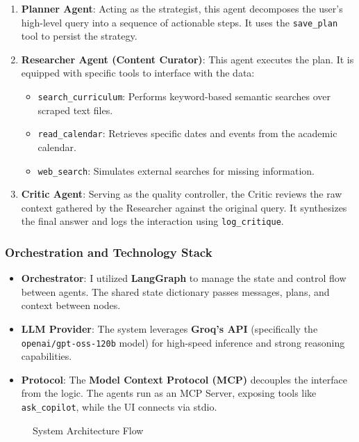 \begin{enumerate}
    \item \textbf{Planner Agent}: Acting as the strategist, this agent decomposes the user's high-level query into a sequence of actionable steps. It uses the \texttt{save\_plan} tool to persist the strategy.
    \item \textbf{Researcher Agent (Content Curator)}: This agent executes the plan. It is equipped with specific tools to interface with the data:
    \begin{itemize}
        \item \texttt{search\_curriculum}: Performs keyword-based semantic searches over scraped text files.
        \item \texttt{read\_calendar}: Retrieves specific dates and events from the academic calendar.
        \item \texttt{web\_search}: Simulates external searches for missing information.
    \end{itemize}
    \item \textbf{Critic Agent}: Serving as the quality controller, the Critic reviews the raw context gathered by the Researcher against the original query. It synthesizes the final answer and logs the interaction using \texttt{log\_critique}.
\end{enumerate}

\subsubsection{Orchestration and Technology Stack}
\begin{itemize}
    \item \textbf{Orchestrator}: I utilized \textbf{LangGraph} to manage the state and control flow between agents. The shared state dictionary passes messages, plans, and context between nodes.
    \item \textbf{LLM Provider}: The system leverages \textbf{Groq's API} (specifically the \texttt{openai/gpt-oss-120b} model) for high-speed inference and strong reasoning capabilities.
    \item \textbf{Protocol}: The \textbf{Model Context Protocol (MCP)} decouples the interface from the logic. The agents run as an MCP Server, exposing tools like \texttt{ask\_copilot}, while the UI connects via stdio.
\end{itemize}

\begin{figure}[H]
    \centering
    \caption{System Architecture Flow}
    \label{fig:arch}
\end{figure}

